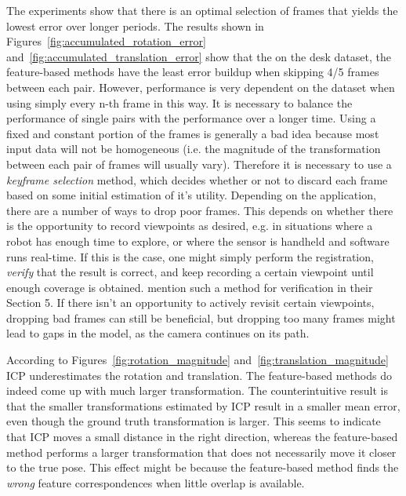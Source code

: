 \documentclass[a4paper]{article}
\begin{document}
The experiments show that there is an optimal selection of frames that yields the lowest error over longer periods. The results shown in Figures~\ref{fig:accumulated_rotation_error} and~\ref{fig:accumulated_translation_error} show that the on the desk dataset, the feature-based methods have the least error buildup when skipping 4/5 frames between each pair. However, performance is very dependent on the dataset when using simply every n-th frame in this way. It is necessary to balance the performance of single pairs with the performance over a longer time. Using a fixed and constant portion of the frames is generally a bad idea because most input data will not be homogeneous (i.e. the magnitude of the transformation between each pair of frames will usually vary). Therefore it is necessary to use a \emph{keyframe selection} method, which decides whether or not to discard each frame based on some initial estimation of it's utility. Depending on the application, there are a number of ways to drop poor frames. This depends on whether there is the opportunity to record viewpoints as desired, e.g. in situations where a robot has enough time to explore, or where the sensor is handheld and software runs real-time. If this is the case, one might simply perform the registration, \emph{verify} that the result is correct, and keep recording a certain viewpoint until enough coverage is obtained. \cite{makadia2006fully} mention such a method for verification in their Section 5. If there isn't an opportunity to actively revisit certain viewpoints, dropping bad frames can still be beneficial, but dropping too many frames might lead to gaps in the model, as the camera continues on its path.

According to Figures~\ref{fig:rotation_magnitude} and~\ref{fig:translation_magnitude} \ac{ICP} underestimates the rotation and translation. The feature-based methods do indeed come up with much larger transformation. The counterintuitive result is that the smaller transformations estimated by \ac{ICP} result in a smaller mean error, even though the ground truth transformation is larger. This seems to indicate that \ac{ICP} moves a small distance in the right direction, whereas the feature-based method performs a larger transformation that does not necessarily move it closer to the true pose. This effect might be because the feature-based method finds the \emph{wrong} feature correspondences when little overlap is available.
\end{document}
